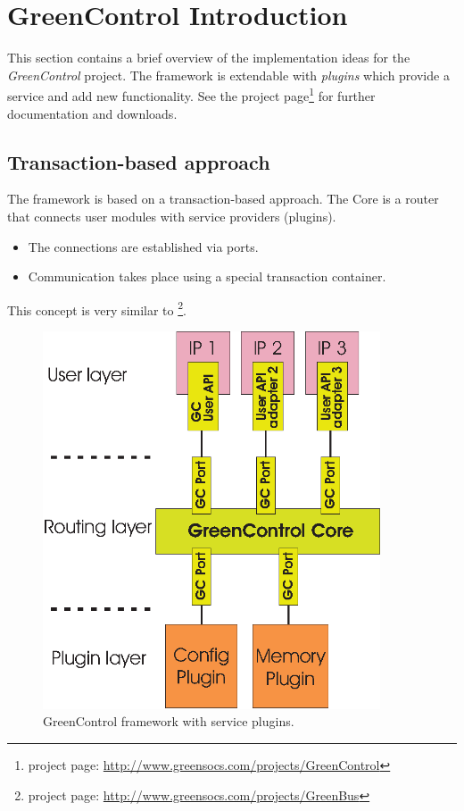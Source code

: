 
\chapter{GreenControl Introduction}

This section contains a brief overview of the implementation ideas for the {\em GreenControl} project. The \GreenControl framework is extendable with \textsl{plugins} which provide a service and add new functionality. See the project page\footnote{\GreenControl project page:  \href{http://www.greensocs.com/projects/GreenControl}{http://www.greensocs.com/projects/GreenControl}} for further documentation and downloads.

\section{Transaction-based approach}

The \GreenControl framework is based on a transaction-based approach. The \GreenControl Core is a router that connects user modules with service providers (plugins).
\begin{itemize}
	\item The connections are established via ports.
	\item Communication takes place using a special transaction container.
\end{itemize}

This concept is very similar to \GreenBus\footnote{\GreenBus project page: \href{http://www.greensocs.com/projects/GreenBus}{http://www.greensocs.com/projects/GreenBus}}.

\begin{figure}[htbp]
	\centerline{
		\includegraphics[width=10cm]{GreenControl.eps}} 
	\caption{GreenControl framework with service plugins.}
	\label{fig:GreenControl}
\end{figure}

